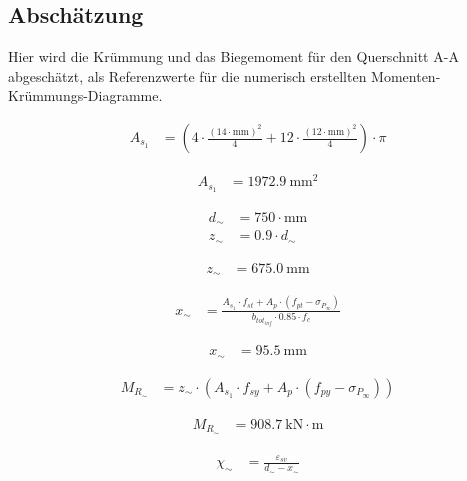 \documentclass[
  11pt,
  letterpaper,
]{scrreprt}
\begin{document}
\subsection{Abschätzung}\label{abschuxe4tzung}

Hier wird die Krümmung und das Biegemoment für den Querschnitt A-A
abgeschätzt, als Referenzwerte für die numerisch erstellten
Momenten-Krümmungs-Diagramme.

$$
\begin{aligned}
A_{s_{1}} &= \left( 4 \cdot \frac{ \left( 14 \cdot \mathrm{mm} \right) ^{ 2 } }{ 4 } + 12 \cdot \frac{ \left( 12 \cdot \mathrm{mm} \right) ^{ 2 } }{ 4 } \right) \cdot \pi \; 
\end{aligned}
$$

$$
\begin{aligned}
A_{s_{1}} &= 1972.9\ \mathrm{mm}^{2} \;
\end{aligned}
$$

$$
\begin{aligned}
d_{\sim} &= 750 \cdot \mathrm{mm} \; 
\\[11pt]
z_{\sim} &= 0.9 \cdot d_{\sim} \; 
\end{aligned}
$$

$$
\begin{aligned}
z_{\sim} &= 675.0\ \mathrm{mm} \;
\end{aligned}
$$

$$
\begin{aligned}
x_{\sim} &= \frac{ A_{s_{1}} \cdot f_{st} + A_{p} \cdot \left( f_{pt} - \sigma_{P_{\infty}} \right) }{ b_{tot_{inf}} \cdot 0.85 \cdot f_{c} } \; 
\end{aligned}
$$

$$
\begin{aligned}
x_{\sim} &= 95.5\ \mathrm{mm} \;
\end{aligned}
$$

$$
\begin{aligned}
M_{R_{\sim}} &= z_{\sim} \cdot \left( A_{s_{1}} \cdot f_{sy} + A_{p} \cdot \left( f_{py} - \sigma_{P_{\infty}} \right) \right) \; 
\end{aligned}
$$

$$
\begin{aligned}
M_{R_{\sim}} &= 908.7\ \mathrm{kN} \cdot \mathrm{m} \;
\end{aligned}
$$

$$
\begin{aligned}
\chi_{\sim} &= \frac{ \varepsilon_{sv} }{ d_{\sim} - x_{\sim} } \; 
\end{aligned}
$$
\end{document}
